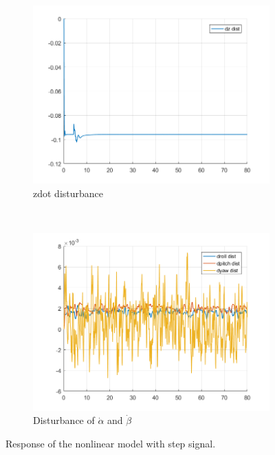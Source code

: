 \documentclass[11pt]{article}
\begin{document}
\begin{enumerate}
\begin{figure}[ht]
        \begin{subfigure}[c]{0.3\linewidth}
            \centering
            \includegraphics[width=\linewidth]{Plots_11_NonlinearModel_StepSignal/10}
            \caption{zdot disturbance}
        \end{subfigure}
        ~
        \begin{subfigure}[c]{0.3\linewidth}
            \centering
            \includegraphics[width=\linewidth]{Plots_11_NonlinearModel_StepSignal/11}
            \caption{Disturbance of $\dot{\alpha}$ and $\dot{\beta}$}
        \end{subfigure}
        
        \caption{Response of the nonlinear model with step signal.}
        \label{fig:nonlinear_model_step_signal}
\end{figure}


\end{enumerate}
\end{document}
